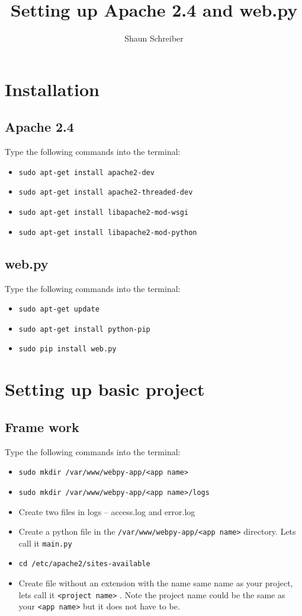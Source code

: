 \documentclass{article}
\author{Shaun Schreiber}
\title{Setting up Apache 2.4 and web.py}
\date{}
\begin{document}
\maketitle

\section{Installation}
\subsection{Apache 2.4}
Type the following commands into the terminal:
\begin{itemize}
\item \verb#sudo apt-get install apache2-dev#
\item \verb#sudo apt-get install apache2-threaded-dev#
\item \verb#sudo apt-get install libapache2-mod-wsgi#
\item \verb#sudo apt-get install libapache2-mod-python#
\end{itemize}
\subsection{web.py}
Type the following commands into the terminal:
\begin{itemize}
\item \verb#sudo apt-get update#
\item \verb#sudo apt-get install python-pip#
\item \verb#sudo pip install web.py#
\end{itemize}

\section{Setting up basic project}
\subsection{Frame work}
Type the following commands into the terminal:
\begin{itemize}
\item \verb#sudo mkdir /var/www/webpy-app/<app name>#
\item \verb#sudo mkdir /var/www/webpy-app/<app name>/logs#
\item Create two files in logs -- access.log and error.log
\item Create a python file in the \verb#/var/www/webpy-app/<app name># directory. Lets call it \verb#main.py#
\item \verb#cd /etc/apache2/sites-available#
\item Create file without an extension with the name same name as your project, lets call it \verb#<project name># . Note the project name could be the same as your \verb#<app name># but it does not have to be.
\end{itemize}
\end{document}
